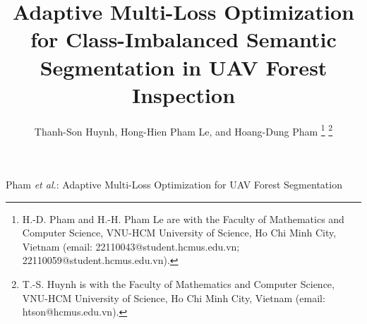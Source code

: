\documentclass[journal,compsoc]{IEEEtran}
\begin{document}
\title{Adaptive Multi-Loss Optimization for Class-Imbalanced Semantic Segmentation in UAV Forest Inspection}

\author{Thanh-Son Huynh, 
        Hong-Hien Pham Le, 
        and Hoang-Dung Pham
\thanks{H.-D. Pham and H.-H. Pham Le are with the Faculty of Mathematics and Computer Science, VNU-HCM University of Science, Ho Chi Minh City, Vietnam (email: 22110043@student.hcmus.edu.vn; 22110059@student.hcmus.edu.vn).}%
\thanks{T.-S. Huynh is with the Faculty of Mathematics and Computer Science, VNU-HCM University of Science, Ho Chi Minh City, Vietnam (email: htson@hcmus.edu.vn).}%
}

%
{Pham \MakeLowercase{\textit{et al.}}: Adaptive Multi-Loss Optimization for UAV Forest Segmentation}

\maketitle
\end{document}
